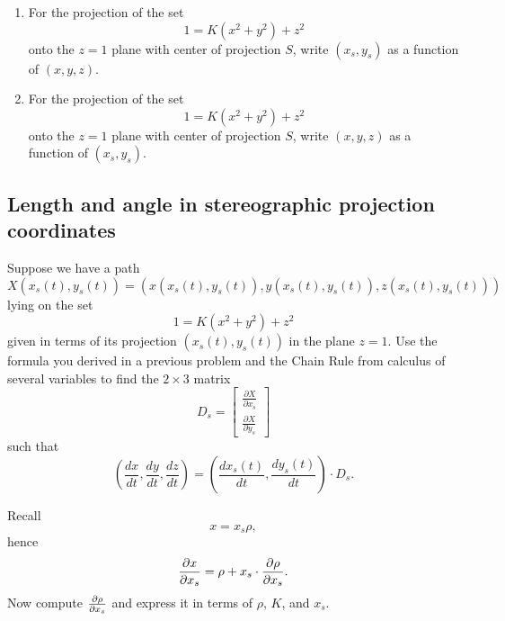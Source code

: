 \documentclass{ximera}
\begin{document}
\begin{problem}\label{35}\hfil
\begin{enumerate}
\item For the projection of the set
\[
1=K\left( x^{2}+y^{2}\right) +z^{2}
\]
onto the $z=1$ plane with center of projection $S$, write $\left(x_{s}
,y_{s}\right)$ as a function of $\left( x,y,z\right) $.
\item For the projection of the set
\[
1=K\left( x^{2}+y^{2}\right) +z^{2}
\]
onto the $z=1$ plane with center of projection $S$, write $\left(
x,y,z\right) $ as a function of $\left( x_{s},y_{s}\right) $.
\end{enumerate}
\end{problem}

\subsection*{Length and angle in stereographic projection coordinates}

\begin{problem}
Suppose we have a path%
\[
X\left(  x_{s}\left(  t\right)  ,y_{s}\left(  t\right)  \right)  =\left(
x\left(  x_{s}\left(  t\right)  ,y_{s}\left(  t\right)  \right)  ,y\left(
x_{s}\left(  t\right)  ,y_{s}\left(  t\right)  \right)  ,z\left(  x_{s}\left(
t\right)  ,y_{s}\left(  t\right)  \right)  \right)
\]
lying on the set 
\[
1=K\left( x^{2}+y^{2}\right) +z^{2}
\]
given in terms of its projection $\left( x_{s}\left( t\right)
,y_{s}\left( t\right) \right) $ in the plane $z=1$. Use the formula
you derived in a previous problem and the Chain Rule from calculus of
several variables to find the $2\times3$ matrix%
\[
D_{s}=
\begin{bmatrix}
\frac{\partial X}{\partial x_{s}} \\
\frac{\partial X}{\partial y_{s}}
\end{bmatrix}
\]
such that%
\[
\left(  \frac{dx}{dt},\frac{dy}{dt},\frac{dz}{dt}\right)  =\left(
\frac{dx_{s}\left(  t\right)  }{dt},\frac{dy_{s}\left(  t\right)  }%
{dt}\right)  \cdot D_{s}.
\]
\begin{hint}
Recall 
\[
x = x_s \rho,
\]
hence 
\[
\pp[x]{x_s} = \rho + x_s\cdot \pp[\rho]{x_s}.
\]
Now compute $\pp[\rho]{x_s}$ and express it in terms of $\rho$, $K$,
and $x_s$.
\end{hint}
\end{problem}
\end{document}
